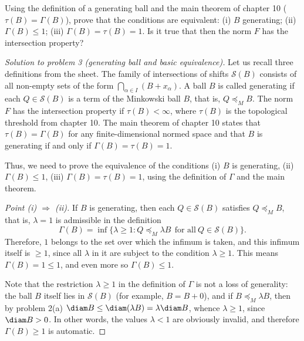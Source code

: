 \documentclass[a4paper,12pt]{report}
\begin{document}
\begin{task}
Using the definition of a generating ball and the main theorem of chapter \textup{10} ($\tau(B)=\Gamma(B)$), prove that the conditions are equivalent\textup{:} \textup{(i)} $B$ generating\textup{;} \textup{(ii)} $\Gamma(B)\le1$\textup{;} \textup{(iii)} $\Gamma(B)=\tau(B)=1$. Is it true that then the norm $F$ has the intersection property?

\end{task}

\begin{proof}[Solution to problem \textup{3} \textup{(}generating ball and basic equivalence\textup{)}]

Let us recall three definitions from the sheet. The family of intersections of shifts $\mathcal S(B)$ consists of all non-empty sets of the form $\bigcap_{\alpha\in I}(B+x_\alpha)$. A ball $B$ is called generating if each $Q\in\mathcal S(B)$ is a term of the Minkowski ball $B$, that is, $Q\preceq_M B$. The norm $F$ has the intersection property if $\tau(B)<\infty$, where $\tau(B)$ is the topological threshold from chapter \textup{10}. The main theorem of chapter \textup{10} states that $\tau(B)=\Gamma(B)$ for any finite-dimensional normed space and that $B$ is generating if and only if $\Gamma(B)=\tau(B)=1$.

Thus, we need to prove the equivalence of the conditions \textup{(i)} $B$ is generating, \textup{(ii)} $\Gamma(B)\le1$, \textup{(iii)} $\Gamma(B)=\tau(B)=1$, using the definition of $\Gamma$ and the main theorem.

\textit{Point \textup{(i)} $\Rightarrow$ \textup{(ii)}.} If $B$ is generating, then each $Q\in\mathcal S(B)$ satisfies $Q\preceq_M B$, that is, $\lambda=1$ is admissible in the definition
\[
\Gamma(B)=\inf\bigl\{\lambda\ge1: Q\preceq_M\lambda B\ \ \text{for all}\ Q\in\mathcal S(B)\bigr\}.
\]
Therefore, $1$ belongs to the set over which the infimum is taken, and this infimum itself is $\ge1$, since all $\lambda$ in it are subject to the condition $\lambda\ge1$. This means $\Gamma(B)=1\le1$, and even more so $\Gamma(B)\le1$.

Note that the restriction $\lambda\ge1$ in the definition of $\Gamma$ is not a loss of generality\textup{:} the ball $B$ itself lies in $\mathcal S(B)$ \textup{(}for example, $B=B+0$\textup{)}, and if $B\preceq_M\lambda B$, then by problem \textup{2}\textup{(a)} $\diam B\le\diam(\lambda B)=\lambda\diam B$, whence $\lambda\ge1$, since $\diam B>0$. In other words, the values $\lambda<1$ are obviously invalid, and therefore $\Gamma(B)\ge1$ is automatic.


\end{proof}
\end{document}
